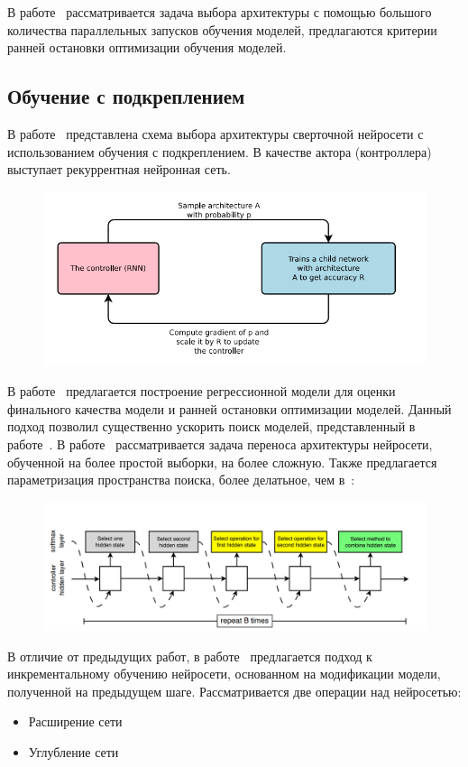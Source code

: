 В работе~\cite{optimal_racing} рассматривается задача выбора архитектуры с помощью большого количества параллельных запусков обучения моделей, предлагаются критерии ранней остановки оптимизации обучения моделей.


\subsection{ Обучение с подкреплением}
В работе~\cite{reinf} представлена схема выбора архитектуры сверточной нейросети с использованием обучения с подкреплением. В качестве актора (контроллера) выступает рекуррентная нейронная сеть.
\begin{figure}[H]
\includegraphics[width=\textwidth]{./plots/arch_review_figs/reinf.png}
\end{figure}
В работе~\cite{reinf_predict} предлагается построение регрессионной модели для оценки финального качества модели и ранней остановки оптимизации моделей. Данный подход позволил существенно ускорить поиск моделей, представленный в работе~\cite{reinf}.
В работе~\cite{reinf_transfer} рассматривается задача переноса архитектуры нейросети, обученной на более простой выборки, на более сложную. Также предлагается параметризация пространства поиска, более делатьное, чем в~\cite{reinf}:
\begin{figure}[H]
\includegraphics[width=\textwidth]{./plots/arch_review_figs/reinf2.png}
\end{figure}

В отличие от предыдущих работ, в работе~\cite{reinf_deep2net} предлагается подход к инкрементальному обучению нейросети, основанном на модификации модели, полученной на предыдущем шаге. Рассматривается две операции над нейросетью:
\begin{itemize}
\item Расширение сети
\item Углубление сети
\end{itemize}

